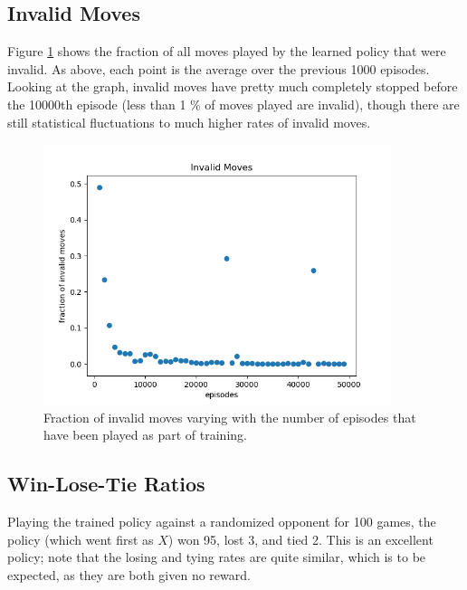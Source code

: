 \documentclass{article}
\begin{document}
   \subsection{Invalid Moves}
   Figure \ref{fig:5c} shows the fraction of all moves played by the learned policy that were invalid. As above, each
   point is the average over the previous 1000 episodes. Looking at the graph, invalid moves have pretty much
   completely stopped before the 10000th episode (less than 1 \% of moves played are invalid), though there are still
   statistical fluctuations to much higher rates of invalid moves.
      \begin{figure}[h] \centering
          \includegraphics[width=4in]{resources/part5c}
          \caption{ Fraction of invalid moves varying with the number of episodes that have been played as
                  part of training. }
          \label{fig:5c}
       \end{figure}

   \subsection{Win-Lose-Tie Ratios}
   Playing the trained policy against a randomized opponent for 100 games, the policy (which went first as $X$)
   won 95, lost 3, and tied 2. This is an excellent policy; note that the losing and tying rates are quite similar,
   which is to be expected, as they are both given no reward.
\end{document}
